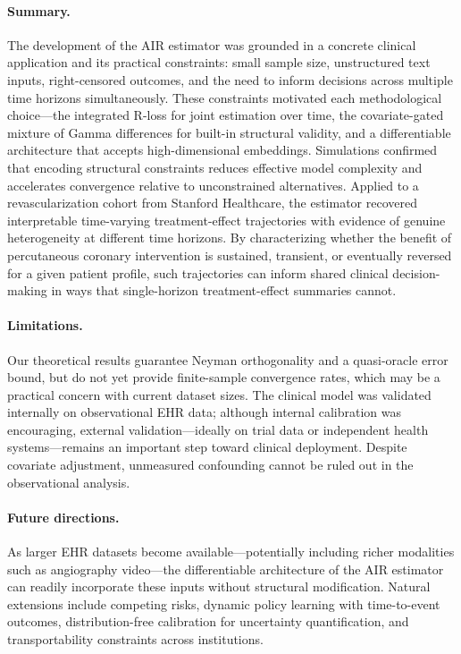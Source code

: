\documentclass{article}
\begin{document}
\paragraph{Summary.}
The development of the AIR estimator was grounded in a concrete clinical application and its practical constraints: small sample size, unstructured text inputs, right-censored outcomes, and the need to inform decisions across multiple time horizons simultaneously.
These constraints motivated each methodological choice---the integrated R-loss for joint estimation over time, the covariate-gated mixture of Gamma differences for built-in structural validity, and a differentiable architecture that accepts high-dimensional embeddings.
Simulations confirmed that encoding structural constraints reduces effective model complexity and accelerates convergence relative to unconstrained alternatives.
Applied to a revascularization cohort from Stanford Healthcare, the estimator recovered interpretable time-varying treatment-effect trajectories with evidence of genuine heterogeneity at different time horizons.
By characterizing whether the benefit of percutaneous coronary intervention is sustained, transient, or eventually reversed for a given patient profile, such trajectories can inform shared clinical decision-making in ways that single-horizon treatment-effect summaries cannot.

\paragraph{Limitations.}
Our theoretical results guarantee Neyman orthogonality and a quasi-oracle error bound, but do not yet provide finite-sample convergence rates, which may be a practical concern with current dataset sizes.
The clinical model was validated internally on observational EHR data; although internal calibration was encouraging, external validation---ideally on trial data or independent health systems---remains an important step toward clinical deployment.
Despite covariate adjustment, unmeasured confounding cannot be ruled out in the observational analysis.

\paragraph{Future directions.}
As larger EHR datasets become available---potentially including richer modalities such as angiography video---the differentiable architecture of the AIR estimator can readily incorporate these inputs without structural modification.
Natural extensions include competing risks, dynamic policy learning with time-to-event outcomes, distribution-free calibration for uncertainty quantification, and transportability constraints across institutions.
\end{document}
